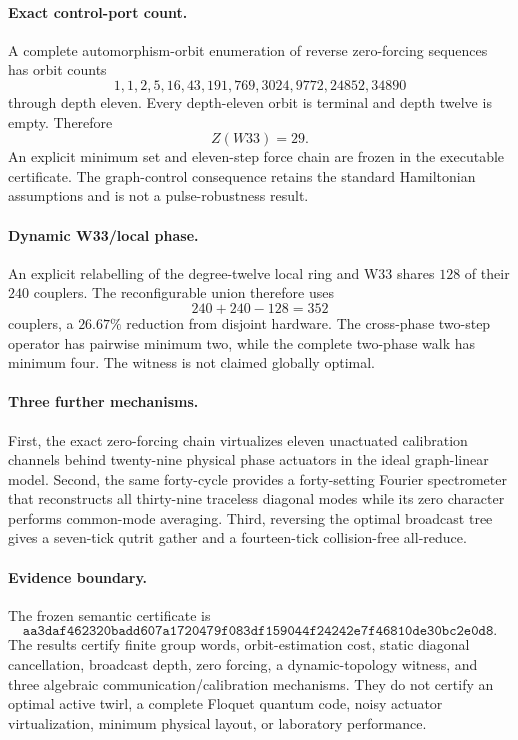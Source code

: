 \paragraph{Exact control-port count.}
A complete automorphism-orbit enumeration of reverse zero-forcing sequences has orbit counts
\[
1,1,2,5,16,43,191,769,3024,9772,24852,34890
\]
through depth eleven.  Every depth-eleven orbit is terminal and depth twelve is empty.  Therefore
\[
\boxed{Z(W33)=29}.
\]
An explicit minimum set and eleven-step force chain are frozen in the executable certificate.  The graph-control consequence retains the standard Hamiltonian assumptions and is not a pulse-robustness result.

\paragraph{Dynamic W33/local phase.}
An explicit relabelling of the degree-twelve local ring and W33 shares $128$ of their $240$ couplers.  The reconfigurable union therefore uses
\[
240+240-128=352
\]
couplers, a $26.67\%$ reduction from disjoint hardware.  The cross-phase two-step operator has pairwise minimum two, while the complete two-phase walk has minimum four.  The witness is not claimed globally optimal.

\paragraph{Three further mechanisms.}
First, the exact zero-forcing chain virtualizes eleven unactuated calibration channels behind twenty-nine physical phase actuators in the ideal graph-linear model.  Second, the same forty-cycle provides a forty-setting Fourier spectrometer that reconstructs all thirty-nine traceless diagonal modes while its zero character performs common-mode averaging.  Third, reversing the optimal broadcast tree gives a seven-tick qutrit gather and a fourteen-tick collision-free all-reduce.

\paragraph{Evidence boundary.}
The frozen semantic certificate is
\[
\texttt{aa3daf462320badd607a1720479f083df159044f24242e7f46810de30bc2e0d8}.
\]
The results certify finite group words, orbit-estimation cost, static diagonal cancellation, broadcast depth, zero forcing, a dynamic-topology witness, and three algebraic communication/calibration mechanisms.  They do not certify an optimal active twirl, a complete Floquet quantum code, noisy actuator virtualization, minimum physical layout, or laboratory performance.
